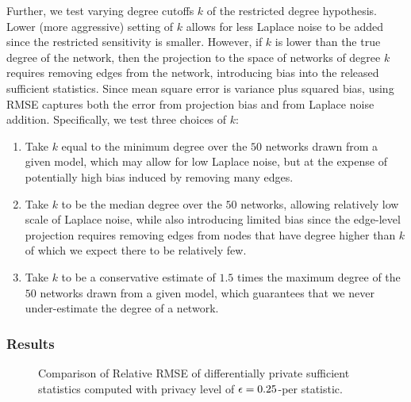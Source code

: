  Further, we test varying degree cutoffs $k$ of the restricted degree hypothesis. Lower (more aggressive) setting of $k$ allows for less Laplace noise to be added since the restricted sensitivity is smaller. However, if $k$ is lower than the true degree of the network, then the projection to the space of networks of degree $k$ requires removing edges from the network, introducing bias into the released sufficient statistics.  Since mean square error is variance plus squared bias, using RMSE captures both the error from projection bias and from Laplace noise addition. Specifically, we test three choices of $k$:
 \vspace{-0.2in}
\begin{enumerate}
	\item Take $k$ equal to the minimum degree over the $50$ networks drawn from a given model, which may allow for low Laplace noise, but at the expense of potentially high bias induced by removing many edges.
	\item Take $k$ to be the median degree over the $50$ networks, allowing relatively low scale of Laplace noise, while also introducing limited bias since the edge-level projection  requires removing edges from nodes that have degree higher than $k$ of which we expect there to be relatively few.
	\item Take $k$ to be a conservative estimate of $1.5$ times the maximum degree of the $50$ networks drawn from a given model, which guarantees that we never under-estimate the degree of a network. 
\end{enumerate}

 \subsubsection{Results}
 \begin{figure}[hp]
 	\caption{Comparison of Relative RMSE of differentially private sufficient statistics computed with privacy level of $\epsilon = 0.25$-per statistic.} %
 	\label{fig:edge_noise}
 	\centering
 	

 \end{figure}
 
